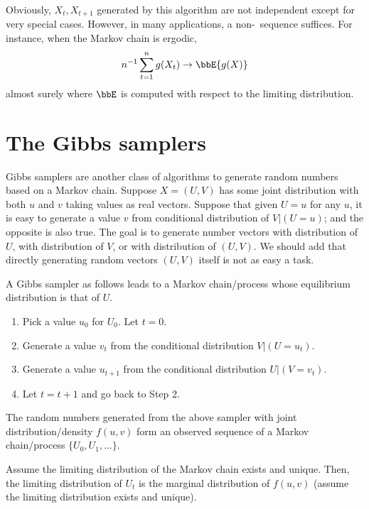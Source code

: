 Obviously, $X_t, X_{t+1}$ generated by this algorithm
are not independent except for
very special cases. However, in many applications,
a non-\iid\ sequence suffices. For instance,
when the Markov chain is ergodic,
\[
n^{-1} \sum_{t=1}^n g(X_t) \to \bbE \{ g(X)\}
\]
almost surely where $\bbE$ is computed with respect to the limiting
distribution.

\section{The Gibbs samplers}

Gibbs samplers are another class of algorithms to generate
random numbers based on a Markov chain.
Suppose $X = (U, V)$ has some joint distribution with
both $u$ and $v$ taking values as real vectors. 
Suppose that given $U = u$ for any $u$, it is easy to generate a
value $v$ from conditional distribution of $V|(U=u)$;
and the opposite is also true.
The goal is to generate number vectors with distribution
of $U$, with distribution of $V$, or with distribution of $(U, V)$.
We should add that directly generating random vectors $(U, V)$
itself is not as easy a task.

A Gibbs sampler as follows leads to a Markov chain/process
whose equilibrium distribution is that of $U$.

\begin{enumerate}
\item
Pick a value $u_0$ for $U_0$. Let $t = 0$.

\item
Generate a value $v_t$ from the conditional distribution $V| (U=u_t)$.

\item
Generate a value $u_{t+1}$ from the conditional distribution $U| (V = v_t)$.

\item
Let $t = t+1$ and go back to Step 2.
\end{enumerate}

\begin{theorem}
The random numbers generated from the above sampler
with joint distribution/density $f(u, v)$ form an observed sequence of a
Markov chain/process $\{U_0, U_1, \ldots \}$.

Assume the limiting distribution of the Markov chain exists and unique.
Then, the limiting distribution of $U_t$ is the marginal distribution
of $f(u, v)$ (assume the limiting distribution exists and unique).
\end{theorem}


